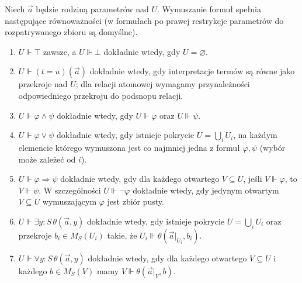 \begin{twierdzenie}\label{cat:thm:cl-kripke-joyal}
Niech $\vec a$ będzie rodziną parametrów nad $U$. Wymuszanie formuł spełnia następujące równoważności (w formułach po prawej restrykcje parametrów do rozpatrywanego zbioru są domyślne).
\begin{enumerate}
 \item $U\Vdash\top$ zawsze, a $U\Vdash\bot$ dokładnie wtedy, gdy $U=\varnothing$.
 \item $U\Vdash(t=u)(\vec a)$ dokładnie wtedy, gdy interpretacje termów są równe jako przekroje nad $U$; dla relacji atomowej wymagamy przynależności odpowiedniego przekroju do podsnopu relacji.
 \item $U\Vdash\varphi\wedge\psi$ dokładnie wtedy, gdy $U\Vdash\varphi$ oraz $U\Vdash\psi$.
 \item $U\Vdash\varphi\vee\psi$ dokładnie wtedy, gdy istnieje pokrycie $U=\bigcup_iU_i$, na każdym elemencie którego wymuszona jest co najmniej jedna z formuł $\varphi,\psi$ (wybór może zależeć od $i$).
 \item $U\Vdash\varphi\Rightarrow\psi$ dokładnie wtedy, gdy dla każdego otwartego $V\subseteq U$, jeśli $V\Vdash\varphi$, to $V\Vdash\psi$. W szczególności $U\Vdash\neg\varphi$ dokładnie wtedy, gdy jedynym otwartym $V\subseteq U$ wymuszającym $\varphi$ jest zbiór pusty.
 \item $U\Vdash\exists y:S\,\theta(\vec a,y)$ dokładnie wtedy, gdy istnieje pokrycie $U=\bigcup_iU_i$ oraz przekroje $b_i\in M_S(U_i)$ takie, że $U_i\Vdash\theta(\vec a|_{U_i},b_i)$.
 \item $U\Vdash\forall y:S\,\theta(\vec a,y)$ dokładnie wtedy, gdy dla każdego otwartego $V\subseteq U$ i każdego $b\in M_S(V)$ mamy $V\Vdash\theta(\vec a|_V,b)$.
\end{enumerate}
\end{twierdzenie}
